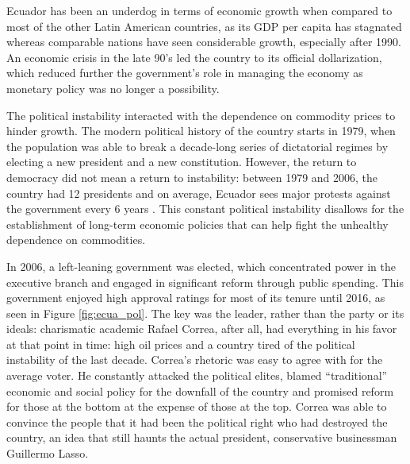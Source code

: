 \documentclass[12pt,a4]{article}\usepackage[]{graphicx}\usepackage[]{xcolor}
\begin{document}
Ecuador has been an underdog in terms of economic growth when compared to most of the other Latin American countries, as its GDP per capita has stagnated whereas comparable nations have seen considerable growth, especially after 1990. An economic crisis in the late 90's led the country to its official dollarization, which reduced further the government's role in managing the economy as monetary policy was no longer a possibility. 

The political instability interacted with the dependence on commodity prices to hinder growth. The modern political history of the country starts in 1979, when the population was able to break a decade-long series of dictatorial regimes by electing a new president and a new constitution. However, the return to democracy did not mean a return to instability: between 1979 and 2006, the country had 12 presidents and on average, Ecuador sees major protests against the government every 6 years \parencite{Loaiza.2022}. This constant political instability disallows for the establishment of long-term economic policies that can help fight the unhealthy dependence on commodities.

In 2006, a left-leaning government was elected, which concentrated power in the executive branch and engaged in significant reform through public spending. This government enjoyed high approval ratings for most of its tenure until 2016, as seen in Figure \ref{fig:ecua_pol}. The key was the leader, rather than the party or its ideals: charismatic academic Rafael Correa, after all, had everything in his favor at that point in time: high oil prices and a country tired of the political instability of the last decade. Correa’s rhetoric was easy to agree with for the average voter. He constantly attacked the political elites, blamed \enquote{traditional} economic and social policy for the downfall of the country and promised reform for those at the bottom at the expense of those at the top. Correa was able to convince the people that it had been the political right who had destroyed the country, an idea that still haunts the actual president, conservative businessman Guillermo Lasso.

\end{document}
